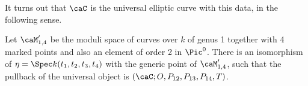 \documentclass{article}
\def\P{\mathbf{P}}
\begin{document}
\begin{ex}

%
%
%
%
%



It turns out that $\caC$ is the universal elliptic curve with this data, in the following sense.


\begin{prop}\label{prop:univ-ec-mbar14-order2} Let $\caM_{1,4}'$ be the moduli space of curves over $k$ of genus 1 together with 4 marked points and also an element of order 2 in $\Pic^0$.  There is an isomorphism of $\eta=\Spec k(t_1,t_2,t_3,t_4)$ with the generic point of $\caM_{1,4}'$, such that the pullback of the universal object is $(\caC;O,P_{12},P_{13},P_{14},T)$. 
\end{prop}


\end{ex}
\end{document}
